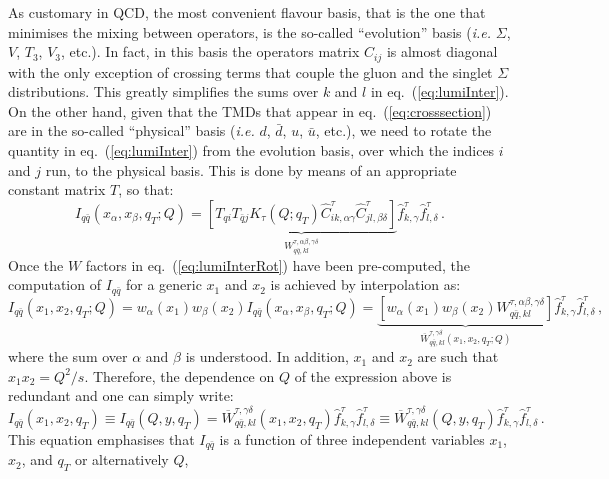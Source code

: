 \documentclass[10pt,a4paper]{article}
\begin{document}
As customary in QCD, the most convenient flavour basis, that is the
one that minimises the mixing between operators, is the so-called
``evolution'' basis (\textit{i.e.} $\Sigma$, $V$, $T_3$, $V_3$,
etc.). In fact, in this basis the operators matrix $C_{ij}$ is almost
diagonal with the only exception of crossing terms that couple the
gluon and the singlet $\Sigma$ distributions. This greatly simplifies
the sums over $k$ and $l$ in eq.~(\ref{eq:lumiInter}). On the other
hand, given that the TMDs that appear in eq.~(\ref{eq:crosssection})
are in the so-called ``physical'' basis (\textit{i.e.} $d$, $\bar{d}$,
$u$, $\bar{u}$, etc.), we need to rotate the quantity in
eq.~(\ref{eq:lumiInter}) from the evolution basis, over which the
indices $i$ and $j$ run, to the physical basis. This is done by means
of an appropriate constant matrix $T$, so that:
\begin{equation}\label{eq:lumiInterRot}
I_{q\bar{q}}(x_\alpha,x_\beta,q_T;Q)= \underbrace{\left[T_{qi}T_{\bar{q}j} K_\tau(Q;q_T)\hat{C}_{ik,\alpha\gamma}^\tau
  \hat{C}_{jl,\beta\delta}^\tau \right]}_{W_{q\bar{q},kl}^{\tau,\alpha\beta,\gamma\delta}} \hat{f}_{k,\gamma}^\tau \hat{f}_{l,\delta}^\tau\,.
\end{equation}
Once the ${W}$ factors in eq.~(\ref{eq:lumiInterRot}) have been
pre-computed, the computation of $I_{q\bar{q}}$ for a generic $x_1$
and $x_2$ is achieved by interpolation as:
\begin{equation}\label{eq:x1x2inter}
  I_{q\bar{q}}(x_1,x_2,q_T;Q) =
  w_\alpha(x_1)w_\beta(x_2)I_{q\bar{q}}(x_\alpha,x_\beta,q_T;Q)
  = \underbrace{\left[w_\alpha(x_1)w_\beta(x_2){W}_{q\bar{q},kl}^{\tau,\alpha\beta,\gamma\delta}\right]}_{\overline{W}_{q\bar{q},kl}^{\tau,\gamma\delta}(x_1,x_2,q_T;Q)}\hat{f}_{k,\gamma}^\tau \hat{f}_{l,\delta}^\tau\,,
\end{equation}
where the sum over $\alpha$ and $\beta$ is understood. In
addition, $x_1$ and $x_2$ are such that $x_1x_2=Q^2/s$. Therefore, the
dependence on $Q$ of the expression above is redundant and one can
simply write:
\begin{equation}\label{eq:finalres}
  I_{q\bar{q}}(x_1,x_2,q_T) \equiv I_{q\bar{q}}(Q, y, q_T) =
\overline{W}_{q\bar{q},kl}^{\tau,\gamma\delta}(x_1,x_2,q_T)\hat{f}_{k,\gamma}^\tau \hat{f}_{l,\delta}^\tau\equiv
\overline{W}_{q\bar{q},kl}^{\tau,\gamma\delta}(Q,y,q_T)\hat{f}_{k,\gamma}^\tau
\hat{f}_{l,\delta}^\tau\,.
\end{equation}
This equation emphasises that $I_{q\bar{q}}$ is a function of three
independent variables $x_1$, $x_2$, and $q_T$ or alternatively $Q$,
\end{document}
